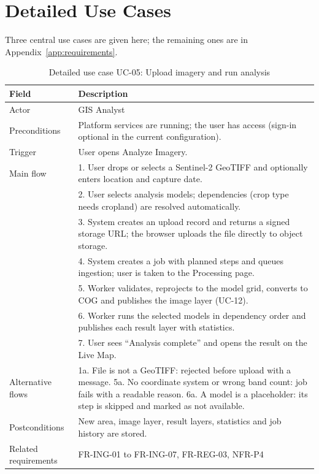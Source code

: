 \section{Detailed Use Cases}
Three central use cases are given here; the remaining ones are in Appendix~\ref{app:requirements}.

\begin{table}[htbp]
\centering\small
\caption{Detailed use case UC-05: Upload imagery and run analysis}
\label{tab:uc05}
\begin{tabularx}{\textwidth}{L{3.0cm} Y}
\toprule
\textbf{Field} & \textbf{Description}\\
\midrule
Actor & GIS Analyst\\
Preconditions & Platform services are running; the user has access (sign-in optional in the current configuration).\\
Trigger & User opens Analyze Imagery.\\
Main flow & 1. User drops or selects a Sentinel-2 GeoTIFF and optionally enters location and capture date.\\
 & 2. User selects analysis models; dependencies (crop type needs cropland) are resolved automatically.\\
 & 3. System creates an upload record and returns a signed storage URL; the browser uploads the file directly to object storage.\\
 & 4. System creates a job with planned steps and queues ingestion; user is taken to the Processing page.\\
 & 5. Worker validates, reprojects to the model grid, converts to COG and publishes the image layer (UC-12).\\
 & 6. Worker runs the selected models in dependency order and publishes each result layer with statistics.\\
 & 7. User sees ``Analysis complete'' and opens the result on the Live Map.\\
Alternative flows & 1a. File is not a GeoTIFF: rejected before upload with a message. 5a. No coordinate system or wrong band count: job fails with a readable reason. 6a. A model is a placeholder: its step is skipped and marked as not available.\\
Postconditions & New area, image layer, result layers, statistics and job history are stored.\\
Related requirements & FR-ING-01 to FR-ING-07, FR-REG-03, NFR-P4\\
\bottomrule
\end{tabularx}
\end{table}

